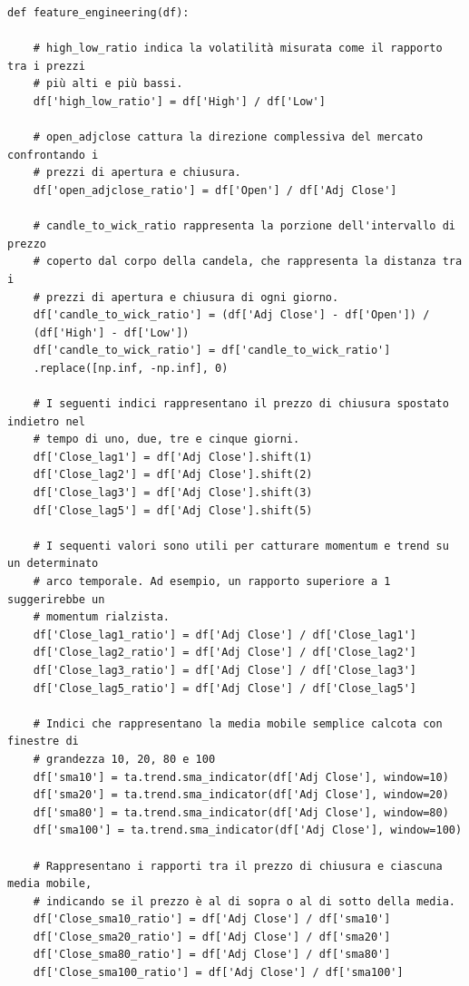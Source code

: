 \documentclass{article}
\begin{document}
\begin{verbatim}
def feature_engineering(df):

    # high_low_ratio indica la volatilità misurata come il rapporto tra i prezzi
    # più alti e più bassi.
    df['high_low_ratio'] = df['High'] / df['Low']

    # open_adjclose cattura la direzione complessiva del mercato confrontando i
    # prezzi di apertura e chiusura.
    df['open_adjclose_ratio'] = df['Open'] / df['Adj Close']

    # candle_to_wick_ratio rappresenta la porzione dell'intervallo di prezzo
    # coperto dal corpo della candela, che rappresenta la distanza tra i 
    # prezzi di apertura e chiusura di ogni giorno.
    df['candle_to_wick_ratio'] = (df['Adj Close'] - df['Open']) / 
    (df['High'] - df['Low'])
    df['candle_to_wick_ratio'] = df['candle_to_wick_ratio']
    .replace([np.inf, -np.inf], 0)

    # I seguenti indici rappresentano il prezzo di chiusura spostato indietro nel
    # tempo di uno, due, tre e cinque giorni.
    df['Close_lag1'] = df['Adj Close'].shift(1)
    df['Close_lag2'] = df['Adj Close'].shift(2)
    df['Close_lag3'] = df['Adj Close'].shift(3)
    df['Close_lag5'] = df['Adj Close'].shift(5)

    # I sequenti valori sono utili per catturare momentum e trend su un determinato
    # arco temporale. Ad esempio, un rapporto superiore a 1 suggerirebbe un 
    # momentum rialzista.
    df['Close_lag1_ratio'] = df['Adj Close'] / df['Close_lag1']
    df['Close_lag2_ratio'] = df['Adj Close'] / df['Close_lag2']
    df['Close_lag3_ratio'] = df['Adj Close'] / df['Close_lag3']
    df['Close_lag5_ratio'] = df['Adj Close'] / df['Close_lag5']

    # Indici che rappresentano la media mobile semplice calcota con finestre di
    # grandezza 10, 20, 80 e 100
    df['sma10'] = ta.trend.sma_indicator(df['Adj Close'], window=10)
    df['sma20'] = ta.trend.sma_indicator(df['Adj Close'], window=20)
    df['sma80'] = ta.trend.sma_indicator(df['Adj Close'], window=80)
    df['sma100'] = ta.trend.sma_indicator(df['Adj Close'], window=100)

    # Rappresentano i rapporti tra il prezzo di chiusura e ciascuna media mobile,
    # indicando se il prezzo è al di sopra o al di sotto della media.
    df['Close_sma10_ratio'] = df['Adj Close'] / df['sma10']
    df['Close_sma20_ratio'] = df['Adj Close'] / df['sma20']
    df['Close_sma80_ratio'] = df['Adj Close'] / df['sma80']
    df['Close_sma100_ratio'] = df['Adj Close'] / df['sma100']


\end{verbatim}
\end{document}
